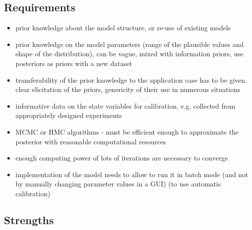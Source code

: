 \documentclass [english,11pt]{article} %
\begin{document}
\subsection*{Requirements}
\begin{itemize}
    \item prior knowledge about the model structure, or re-use of existing models
    \item prior knowledge on the model parameters (range of the plausible values and shape of the distribution), can be vague, mixed with information priors, use posteriors as priors with a new dataset
    \item transferability of the prior knowledge to the application case has to be given. clear elicitation of the priors, genericity of their use in numerous situations
    \item informative data on the state variables for calibration, e.g. collected from appropriately designed experiments
    \item MCMC or HMC algorithms - must be efficient enough to approximate the posterior with reasonable computational resources
    \item enough computing power of lots of iterations are necessary to converge
    \item implementation of the model needs to allow to run it in batch mode (and not by manually changing parameter values in a GUI) (to use automatic calibration)
    
\end{itemize}


\subsection*{Strengths}
\end{document}
